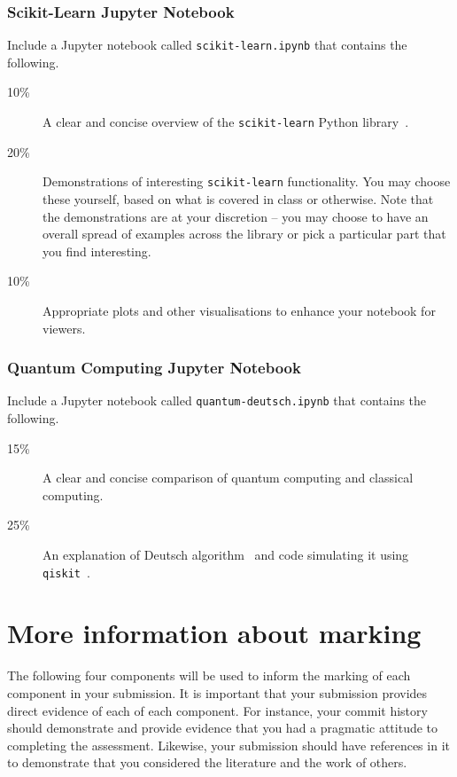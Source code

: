 \documentclass[a4paper, 12pt]{scrartcl}
\begin{document}
  \subsubsection*{Scikit-Learn Jupyter Notebook}
  Include a Jupyter notebook called \texttt{scikit-learn.ipynb} that contains the following.
  \begin{description}
    \item[10\%] A clear and concise overview of the \texttt{scikit-learn} Python library~\cite{scikit-learn}.
    \item[20\%] Demonstrations of interesting \texttt{scikit-learn} functionality. You may choose these yourself, based on what is covered in class or otherwise. Note that the demonstrations are at your discretion -- you may choose to have an overall spread of examples across the library or pick a particular part that you find interesting.
    \item[10\%] Appropriate plots and other visualisations to enhance your notebook for viewers.
  \end{description}
  
  \subsubsection*{Quantum Computing Jupyter Notebook}
  Include a Jupyter notebook called \texttt{quantum-deutsch.ipynb} that contains the following.
  \begin{description}
    \item[15\%] A clear and concise comparison of quantum computing and classical computing.
    \item[25\%] An explanation of Deutsch algorithm~\cite{deutschalgorithm} and code simulating it using \texttt{qiskit}~\cite{qiskit}.
  \end{description}

  \section*{More information about marking}
    The following four components will be used to inform the marking of each component in your submission.
    It is important that your submission provides direct evidence of each of each component.
    For instance, your commit history should demonstrate and provide evidence that you had a pragmatic attitude to completing the assessment.
    Likewise, your submission should have references in it to demonstrate that you considered the literature and the work of others.
  
\end{document}
